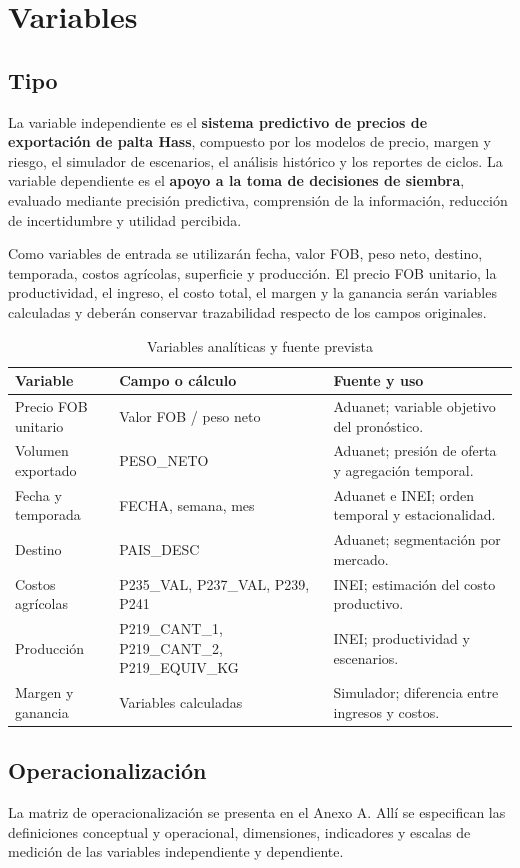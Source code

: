 \section{Variables}

\subsection{Tipo}

La variable independiente es el \textbf{sistema predictivo de precios de exportación de palta Hass}, compuesto por los modelos de precio, margen y riesgo, el simulador de escenarios, el análisis histórico y los reportes de ciclos. La variable dependiente es el \textbf{apoyo a la toma de decisiones de siembra}, evaluado mediante precisión predictiva, comprensión de la información, reducción de incertidumbre y utilidad percibida.

Como variables de entrada se utilizarán fecha, valor FOB, peso neto, destino, temporada, costos agrícolas, superficie y producción. El precio FOB unitario, la productividad, el ingreso, el costo total, el margen y la ganancia serán variables calculadas y deberán conservar trazabilidad respecto de los campos originales.

\begin{table}[H]
\centering
\caption{Variables analíticas y fuente prevista}
\small
\begin{tabularx}{\textwidth}{p{3.3cm}p{3.1cm}X}
\toprule
\textbf{Variable} & \textbf{Campo o cálculo} & \textbf{Fuente y uso} \\
\midrule
Precio FOB unitario & Valor FOB / peso neto & Aduanet; variable objetivo del pronóstico. \\
Volumen exportado & PESO\_NETO & Aduanet; presión de oferta y agregación temporal. \\
Fecha y temporada & FECHA, semana, mes & Aduanet e INEI; orden temporal y estacionalidad. \\
Destino & PAIS\_DESC & Aduanet; segmentación por mercado. \\
Costos agrícolas & P235\_VAL, P237\_VAL, P239, P241 & INEI; estimación del costo productivo. \\
Producción & P219\_CANT\_1, P219\_CANT\_2, P219\_EQUIV\_KG & INEI; productividad y escenarios. \\
Margen y ganancia & Variables calculadas & Simulador; diferencia entre ingresos y costos. \\
\bottomrule
\end{tabularx}
\end{table}

\subsection{Operacionalización}

La matriz de operacionalización se presenta en el Anexo A. Allí se especifican las definiciones conceptual y operacional, dimensiones, indicadores y escalas de medición de las variables independiente y dependiente.
